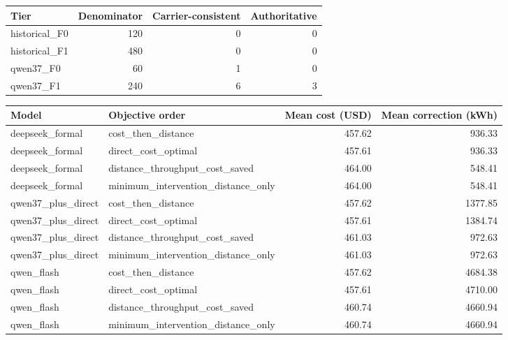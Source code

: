 \begin{tabular}{lrrr}
\toprule
Tier & Denominator & Carrier-consistent & Authoritative \\
\midrule
historical\_F0 & 120 & 0 & 0 \\
historical\_F1 & 480 & 0 & 0 \\
qwen37\_F0 & 60 & 1 & 0 \\
qwen37\_F1 & 240 & 6 & 3 \\
\bottomrule
\end{tabular}

\begin{tabular}{llrr}
\toprule
Model & Objective order & Mean cost (USD) & Mean correction (kWh) \\
\midrule
deepseek\_formal & cost\_then\_distance & 457.62 & 936.33 \\
deepseek\_formal & direct\_cost\_optimal & 457.61 & 936.33 \\
deepseek\_formal & distance\_throughput\_cost\_saved & 464.00 & 548.41 \\
deepseek\_formal & minimum\_intervention\_distance\_only & 464.00 & 548.41 \\
qwen37\_plus\_direct & cost\_then\_distance & 457.62 & 1377.85 \\
qwen37\_plus\_direct & direct\_cost\_optimal & 457.61 & 1384.74 \\
qwen37\_plus\_direct & distance\_throughput\_cost\_saved & 461.03 & 972.63 \\
qwen37\_plus\_direct & minimum\_intervention\_distance\_only & 461.03 & 972.63 \\
qwen\_flash & cost\_then\_distance & 457.62 & 4684.38 \\
qwen\_flash & direct\_cost\_optimal & 457.61 & 4710.00 \\
qwen\_flash & distance\_throughput\_cost\_saved & 460.74 & 4660.94 \\
qwen\_flash & minimum\_intervention\_distance\_only & 460.74 & 4660.94 \\
\bottomrule
\end{tabular}
